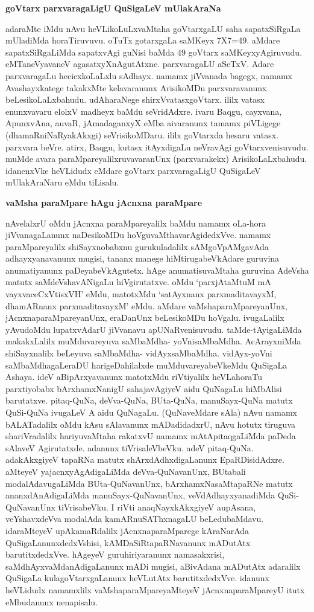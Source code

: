 {\bigskip
\noindent
{\large\bf goVtarx parxvaragaLigU QuSigaLeV mUlakAraNa}}\label{page139}
\medskip

\noindent
adaraMte iMdu nAvu heVLikoLuLxvaMtaha goVtarxgaLU saha sapatxSiRgaLa mUladiMda horaTiruvuvu. oTuTx gotarxgaLa saMKeyx {\rm 7X7=49.} aMdare sapatxSiRgaLiMda sapatxvAgi guNisi baMda {\rm 49} goVtarx saMKeyxyAgiruvudu. eMTaneVyavaneV agasatxyXnAgutAtxne. parxvaragaLU aSeTxV. Adare parxvaragaLu hecicxkoLaLxlu sAdhayx. namamx jiVvanada bagegx, namamx Avashayxkatege takakxMte kelavaranunx ArisikoMDu parxvaravanunx beLesikoLaLxbahudu. udAharaNege shirxVvatasxgoVtarx. ililx vatasx enunxvavaru elolxV madheyx baMdu seVridAdxre. ivaru Baqgu, cayxvana, ApunxvAna, auvaR, jAmadaganxyX eMba aivaranunx tamamx piVLigege (dhamaRniNaRyakAkxgi) seVrisikoMDaru. ililx goVtarxda hesaru vatasx. parxvara beVre. atirx, Baqgu, kutasx itAyxdigaLu neVravAgi goVtarxvenisuvudu. muMde avara paraMpareyalilxruvavaranUnx (parxvarakekx) ArisikoLaLxbahudu. idanenxVke heVLidudx eMdare goVtarx parxvaragaLigU QuSigaLeV mUlakAraNaru eMdu tiLisalu.

{\bigskip
\noindent
{\large\bf vaMsha paraMpare hAgu jAcnxna paraMpare}}\label{page139a}
\medskip

\noindent
nAvelalxrU oMdu jAcnxna paraMpareyalilx baMdu namamx oLa-hora jiVvanagaLanunx naDesikoMDu hoVguvaMthavarAgidedxVve. namamx paraMpareyalilx shiSayxnobabxnu gurukuladalilx sAMgoVpAMgavAda adhayxyanavanunx mugisi, tananx manege hiMtirugabeVkAdare guruvina anumatiyanunx paDeyabeVkAgutetx. hAge anumatisuvaMtaha guruvina AdeVsha matutx saMdeVshavANigaLu hiVgirutatxve. oMdu `parxjAtaMtuM mA vayxvaceCxVtisxVH'\label{139} eMdu, matotxMdu `satAyxnanx parxmaditavayxM, dhamARnanx parxmaditavayxM' eMdu. aMdare vaMshaparaMpareyanUnx, jAcnxnaparaMpareyanUnx, eraDanUnx beLesikoMDu hoVgalu. ivugaLalilx yAvudoMdu lupatxvAdarU jiVvanavu apUNaRvenisuvudu. taMde-tAyigaLiMda makakxLalilx muMduvareyuva saMbaMdha- yoVnisaMbaMdha. AcArayxniMda shiSayxnalilx beLeyuva saMbaMdha- vidAyxsaMbaMdha. vidAyx-yoVni saMbaMdhagaLeraDU harigeDahilalxde muMduvareyabeVkeMdu QuSigaLa Ashaya. ideV aBipArxyavanunx matotxMdu riVtiyalilx heVLahoraTu parxtiyobabx bArxhamxNanigU sahajavAgiyeV aidu QuNagaLu hiMbAlisi barutatxve. pitaq-QuNa, deVva-QuNa, BUta-QuNa, manuSayx-QuNa matutx QuSi-QuNa ivugaLeV A aidu QuNagaLu. (QuNaveMdare sAla) nAvu namamx bALATadalilx oMdu kAsu sAlavanunx mADadidadxrU, nAvu hotutx tiruguva shariVradalilx hariyuvaMtaha rakatxvU \hbox{namamx} mAtApitaqgaLiMda paDeda sAlaveV Agirutatxde. adanunx tiVrisaleVbeVku. adeV pitaq-QuNa. adakAkxgiyeV tapaRNa matutx shArxdAdhxdigaLanunx EpaRDisidAdxre. aMteyeV yajacnxyAgAdigaLiMda deVva-QuNavanUnx, BUtabali modalAdavugaLiMda BUta-QuNavanUnx, bArxhamxNasaMtapaRNe matutx ananxdAnAdigaLiMda manuSayx-QuNavanUnx, veVdAdhayxyanadiMda QuSi-QuNavanUnx tiVrisabeVku. I riVti anaqNayxkAkxgiyeV aupAsana, veYshavxdeVva modalAda kamARnuSAThxnagaLU beLedubaMdavu. idaraMteyeV upAkamaRdalilx jAcnxnaparaMparege kAraNarAda QuSigaLanunxdedxVshisi, kAMDaSiRtapaRNavanunx mADutAtx barutitxdedxVve. hAgeyeV guruhiriyaranunx namasakxrisi, saMdhAyxvaMdanAdigaLanunx mADi mugisi, aBivAdana mADutAtx adaralilx QuSigaLa kulagoVtarxgaLanunx heVLutAtx barutitxdedxVve. idanunx heVLidudx namamxlilx vaMshaparaMpareyaMteyeV jAcnxnaparaMpareyU itutx eMbudanunx nenapisalu.

